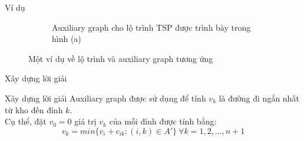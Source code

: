 \documentclass[compress]{beamer}
\begin{document}
\begin{frame}{Ví dụ}
\begin{figure}
\begin{subfigure}{0.65\textwidth}
\begin{tikzpicture}[scale=0.5,every node/.style={scale=0.5},
state/.style ={circle,draw},state1/.style ={circle,dashed,draw}]
\end{tikzpicture}
\caption{Auxiliary graph cho lộ trình TSP được trình bày trong hình (a)}\label{augraph}
\end{subfigure}
\caption{Một ví dụ về lộ trình và auxiliary graph tương ứng}
\label{vd1}
\end{figure}
\end{frame}
\begin{frame}{Xây dựng lời giải}
\begin{block}{Xây dựng lời giải}
 Auxiliary graph được sử dụng để tính $v_k$ là đường đi ngắn nhất từ kho đến đỉnh $k$.\\
Cụ thể, đặt $v_0=0$ giá trị $v_k$ của mỗi đỉnh được tính bằng: 
$$v_k=min\{v_i+c_{ik}:(i,k) \in A'\} \ \forall k=1,2,\ldots,n+1$$
\end{block}
\end{frame}
\end{document}
